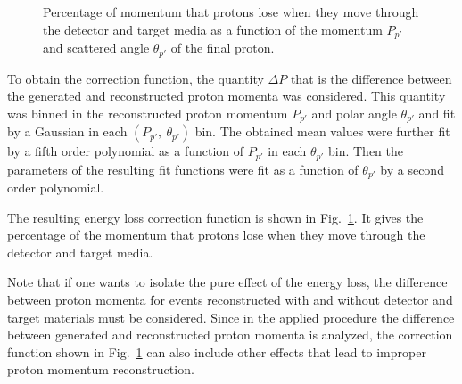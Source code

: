 \begin{figure}[htp]
\begin{center}
\caption{\small Percentage of momentum that protons lose when they move through the detector and target media as a function of the momentum $P_{p'}$ and scattered angle $\theta_{p'}$ of the final proton. \label{fig:eloss}} 
\end{center}
\end{figure}

To obtain the correction function, the quantity $\Delta P$ that is the difference between the generated and reconstructed proton momenta was considered. This quantity was binned in the reconstructed proton momentum $P_{p'}$ and polar angle $\theta_{p'}$ and fit by a Gaussian in each $(P_{p'},~\theta_{p'})$ bin. The obtained mean values were further fit by a fifth order polynomial as a function of $P_{p'}$ in each $\theta_{p'}$ bin. Then the parameters of the resulting fit functions were fit as a function of $\theta_{p'}$ by a second order polynomial. 



The resulting energy loss correction function is shown in Fig.~\ref{fig:eloss}. It gives the percentage of the momentum that protons lose when they move through the detector and target media. %

Note that if one wants to isolate the pure effect of the energy loss, the difference between proton momenta for events reconstructed with and without detector and target materials must be considered. Since in the applied procedure the difference between generated and reconstructed proton momenta is analyzed, the correction function shown in Fig.~\ref{fig:eloss} can also include other effects that lead to improper proton momentum reconstruction.



